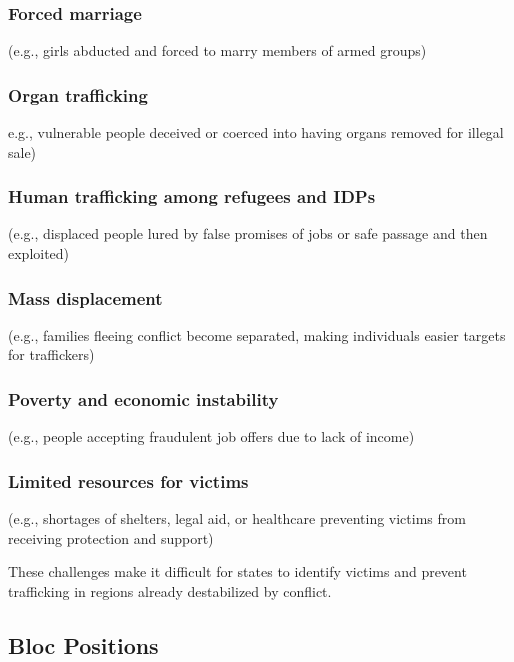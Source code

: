 \subsubsection{Forced marriage}

(e.g., girls abducted and forced to marry members of armed groups)

\subsubsection{Organ trafficking}

e.g., vulnerable people deceived or coerced into having organs removed for illegal sale)

\subsubsection{Human trafficking among refugees and IDPs}

(e.g., displaced people lured by false promises of jobs or safe passage and then exploited)

\subsubsection{Mass displacement}

(e.g., families fleeing conflict become separated, making individuals easier targets for traffickers)

\subsubsection{Poverty and economic instability}

(e.g., people accepting fraudulent job offers due to lack of income)

\subsubsection{Limited resources for victims}

(e.g., shortages of shelters, legal aid, or healthcare preventing victims from receiving protection and support)

These challenges make it difficult for states to identify victims and prevent trafficking in regions already destabilized by conflict.

\subsection{Bloc Positions}

